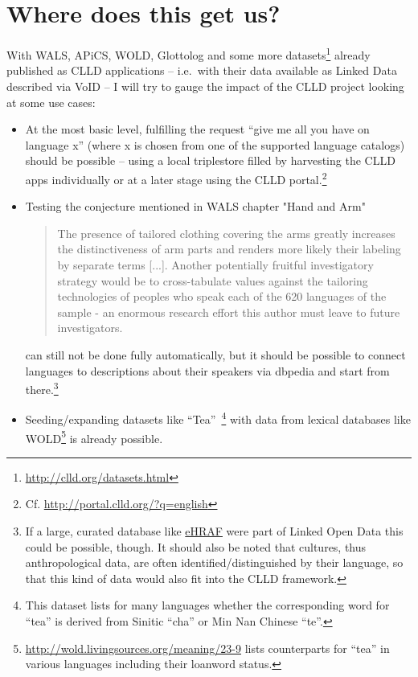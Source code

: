 \documentclass[a4paper,10pt]{article}
\begin{document}
\section{Where does this get us?}

With WALS, APiCS, WOLD, Glottolog and some more datasets\footnote{\url{http://clld.org/datasets.html}}
already published as CLLD applications -- i.e.~with their data available as Linked Data described
via VoID -- I will try to gauge the impact of the CLLD project looking at some use cases:
\begin{itemize}
\item At the most basic level,
fulfilling the request ``give me all you have on language x'' (where x is chosen from one of
the supported language catalogs)
should be possible -- using a local triplestore filled by harvesting the CLLD apps individually
or at a later stage using the CLLD portal.\footnote{Cf. \url{http://portal.clld.org/?q=english}}
\item Testing the conjecture mentioned in WALS chapter "Hand and Arm" \cite{wals-129}
\begin{quote}
The presence of tailored clothing covering the arms greatly increases the distinctiveness of
arm parts and renders more likely their labeling by separate terms [...]. Another potentially
fruitful investigatory strategy would be to cross-tabulate values against the tailoring
technologies of peoples who speak each of the 620 languages of the sample - an enormous
research effort this author must leave to future investigators.
\end{quote}
can still not be done fully automatically, but it should be possible to connect languages
to descriptions about their speakers via dbpedia and start from there.\footnote{If a large,
curated database like \href{http://www.yale.edu/hraf/}{eHRAF} were part of Linked Open Data
this could be possible, though. It should also be noted that cultures, thus anthropological
data, are often identified/distinguished by their language, so that this kind of data
would also fit into the CLLD framework.}
\item Seeding/expanding datasets like ``Tea''~\cite{wals-138}\footnote{This dataset lists for many
languages whether the corresponding word for ``tea'' is derived from Sinitic ``cha'' or
Min Nan Chinese ``te''.}
with data from lexical databases like WOLD\footnote{\url{http://wold.livingsources.org/meaning/23-9}
 lists counterparts for ``tea'' in various languages including their loanword status.}
is already possible.
\end{itemize}
\end{document}
